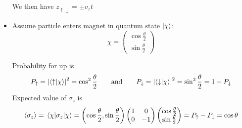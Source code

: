 \documentclass[11pt, a4paper]{article}
\newcommand{\ua}{\uparrow}  %
\newcommand{\da}{\downarrow}  %
\begin{document}
\begin{itemize}
    We then have $ z_{\ua \da} = \pm v_{z} t $
    
    \item Assume particle enters magnet in quantum state $ \ket{\chi} $:
    \begin{equation*}
        \chi = 
        \begin{pmatrix}
            \cos \frac{\theta}{2}\\
            \sin \frac{\theta}{2}
        \end{pmatrix}
    \end{equation*}
    
    Probability for up is 
    \begin{equation*}
        P_{\ua} = \abs{\braket{\ua}{\chi}}^{2} = \cos^{2}\frac{\theta}{2} \qquad \text{and} \qquad P_{\da} = \abs{\braket{\da}{\chi}}^{2} = \sin^{2} \frac{\theta}{2} = 1 - P_{\da}
    \end{equation*}
    Expected value of $ \sigma_{z} $ is
    \begin{equation*}
        \ev{\sigma_{z}} = \mel{\chi}{\sigma_{z}}{\chi} = 
        \left( \cos \frac{\theta}{2}, \sin \frac{\theta}{2} \right) 
        \begin{pmatrix}
            1 & 0\\
            0 & -1
        \end{pmatrix}
        \begin{pmatrix}
            \cos \frac{\theta}{2}\\
            \sin \frac{\theta}{2}
        \end{pmatrix}
        = P_{\ua} - P_{\da} = \cos \theta
    \end{equation*}
    
    
\end{itemize}
\end{document}
